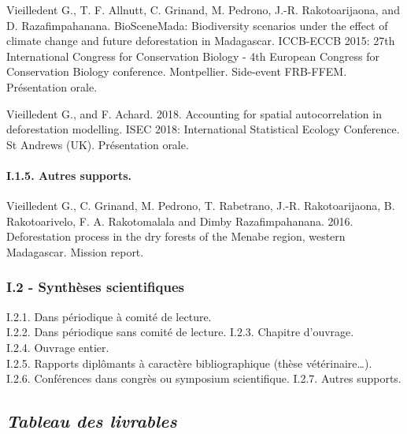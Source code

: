 \documentclass[12pt,]{article}
\let\oldparagraph\paragraph
\renewcommand{\paragraph}[1]{\oldparagraph{#1}\mbox{}}
\begin{document}
Vieilledent G., T. F. Allnutt, C. Grinand, M. Pedrono, J.-R.
Rakotoarijaona, and D. Razafimpahanana. BioSceneMada: Biodiversity
scenarios under the effect of climate change and future deforestation in
Madagascar. ICCB-ECCB 2015: 27th International Congress for Conservation
Biology - 4th European Congress for Conservation Biology conference.
Montpellier. Side-event FRB-FFEM. Présentation orale.

Vieilledent G., and F. Achard. 2018. Accounting for spatial
autocorrelation in deforestation modelling. ISEC 2018: International
Statistical Ecology Conference. St Andrews (UK). Présentation orale.

\hypertarget{i.1.5.-autres-supports.}{%
\paragraph{I.1.5. Autres supports.}\label{i.1.5.-autres-supports.}}

Vieilledent G., C. Grinand, M. Pedrono, T. Rabetrano, J.-R.
Rakotoarijaona, B. Rakotoarivelo, F. A. Rakotomalala and Dimby
Razafimpahanana. 2016. Deforestation process in the dry forests of the
Menabe region, western Madagascar. Mission report.

\hypertarget{i.2---syntheses-scientifiques}{%
\subsubsection{I.2 - Synthèses
scientifiques}\label{i.2---syntheses-scientifiques}}

I.2.1. Dans périodique à comité de lecture.\\
I.2.2. Dans périodique sans comité de lecture. I.2.3. Chapitre
d'ouvrage.\\
I.2.4. Ouvrage entier.\\
I.2.5. Rapports diplômants à caractère bibliographique (thèse
vétérinaire\ldots{}).\\
I.2.6. Conférences dans congrès ou symposium scientifique. I.2.7. Autres
supports.

\newpage

\hypertarget{tableau-des-livrables}{%
\subsection{\texorpdfstring{\emph{Tableau des
livrables}}{Tableau des livrables}}\label{tableau-des-livrables}}
\end{document}
